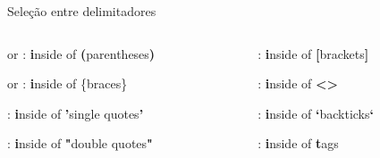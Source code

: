 \begin{frame}{Seleção entre delimitadores}
    \begin{columns}
        \begin{column}{0.6\textwidth}
            \begin{widedescription}
                \item {} or : \textbf{i}nside of \textbf{(}parentheses\textbf{)}
                \item {} or : \textbf{i}nside of \{braces\}
                \item {}: \textbf{i}nside of \textbf{'}single quotes\textbf{'}
                \item {}: \textbf{i}nside of \textbf{"}double quotes\textbf{"}
            \end{widedescription}
        \end{column}
        
        \begin{column}{0.4\textwidth}
            \begin{widedescription}
                \item \key{i]}: \textbf{i}nside of \textbf{[}brackets\textbf{]}
                \item {}: \textbf{i}nside of \textbf{\textless\textgreater}
                \item {}: \textbf{i}nside of \textbf{`}backticks\textbf{`}
                \item {}: \textbf{i}nside of \textbf{t}ags
            \end{widedescription}
        \end{column}
    \end{columns}
\end{frame}


